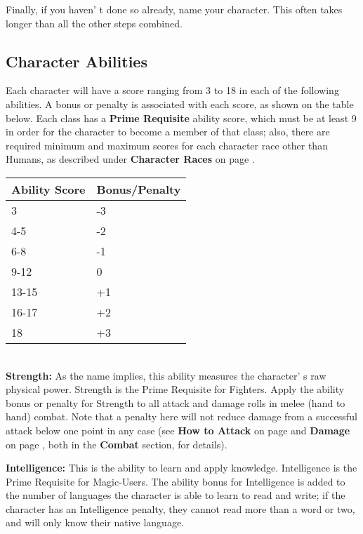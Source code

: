 \documentclass[a4paper,twoside,openany,10pt]{book}
\begin{document}
\begin{multicols}{2}
Finally, if you haven' t done so already, name your character. This often takes longer than all the other steps combined.

\subsection{Character Abilities}\label{character-abilities}

Each character will have a score ranging from 3 to 18 in each of the following abilities. A bonus or penalty is associated with each score, as shown on the table below. Each class has a \textbf{Prime Requisite} ability score, which must be at least 9 in order for the character to become a member of that class; also, there are required minimum and maximum scores for each character race other than Humans, as described under \textbf{Character Races} on page \hyperlink{character-races}{\pageref{character-races}}.\\

\begin{tabular*}{0.93\linewidth}{@{\extracolsep{\fill}}ll}
\textbf{Ability Score} & \textbf{Bonus/Penalty} \\\toprule
3 & -3 \\\hline
4-5 & -2 \\\hline
6-8 & -1 \\\hline
9-12 & 0 \\\hline
13-15 & +1 \\\hline
16-17 & +2 \\\hline
18 & +3 \\\bottomrule
\end{tabular*}\\

\textbf{Strength:} As the name implies, this ability measures the character' s raw physical power. Strength is the Prime Requisite for Fighters. Apply the ability bonus or penalty for Strength to all attack and damage rolls in melee (hand to hand) combat. Note that a penalty here will not reduce damage from a successful attack below one point in any case (see \textbf{How to Attack} on page \hyperlink{how-to-attack}{\pageref{how-to-attack}} and \textbf{Damage} on page \hyperlink{damage}{\pageref{damage}}, both in the \textbf{Combat} section,
for details).

\textbf{Intelligence:} This is the ability to learn and apply knowledge. Intelligence is the Prime Requisite for Magic-Users. The ability bonus for Intelligence is added to the number of languages the character is able to learn to read and write; if the character has an Intelligence penalty, they cannot read more than a word or two, and will only know their native language.


\end{multicols}
\end{document}
